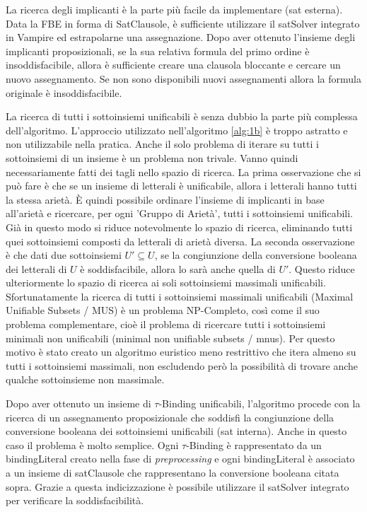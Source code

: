 \documentclass[./main.tex]{subfiles}
\begin{document}
La ricerca degli implicanti è la parte più facile da implementare (sat esterna). 
Data la FBE in forma di SatClausole, è sufficiente utilizzare il satSolver integrato in Vampire ed estrapolarne una assegnazione.
Dopo aver ottenuto l'insieme degli implicanti proposizionali, se la sua relativa 
formula del primo ordine è insoddisfacibile, allora è sufficiente creare una clausola bloccante e cercare un nuovo assegnamento.
Se non sono disponibili nuovi assegnamenti allora la formula originale è insoddisfacibile.

La ricerca di tutti i sottoinsiemi unificabili è senza dubbio la parte più complessa dell'algoritmo.
L'approccio utilizzato nell'algoritmo \ref{alg:1b} è troppo astratto e non utilizzabile nella pratica.
Anche il solo problema di iterare su tutti i sottoinsiemi di un insieme è un problema non trivale.
Vanno quindi necessariamente fatti dei tagli nello spazio di ricerca.
La prima osservazione che si può fare è che se un insieme di letterali è unificabile, allora i letterali hanno tutti la stessa arietà.
È quindi possibile ordinare l'insieme di implicanti in base all'arietà e ricercare, per ogni 'Gruppo di Arietà', tutti i sottoinsiemi unificabili.
Già in questo modo si riduce notevolmente lo spazio di ricerca, eliminando tutti quei sottoinsiemi composti da letterali di arietà diversa.
La seconda osservazione è che dati due sottoinsiemi $U' \subseteq U$, se la congiunzione della conversione booleana dei letterali di $U$ è 
soddisfacibile, allora lo sarà anche quella di $U'$. 
Questo riduce ulteriormente lo spazio di ricerca ai soli sottoinsiemi massimali unificabili.
Sfortunatamente la ricerca di tutti i sottoinsiemi massimali unificabili (Maximal Unifiable Subsets / MUS) è un problema NP-Completo, così come 
il suo problema complementare, cioè il problema di ricercare tutti i sottoinsiemi minimali non unificabili (minimal non unifiable subsets / mnus).
Per questo motivo è stato creato un algoritmo euristico meno restrittivo che itera almeno su tutti i sottoinsiemi massimali,
non escludendo però la possibilità di trovare anche qualche sottoinsieme non massimale.

Dopo aver ottenuto un insieme di $\tau$-Binding unificabili, l'algoritmo procede con la ricerca di un 
assegnamento proposizionale che soddisfi la congiunzione della conversione booleana dei sottoinsiemi unificabili (sat interna).
Anche in questo caso il problema è molto semplice. Ogni $\tau$-Binding è rappresentato da un bindingLiteral creato nella fase di \textit{preprocessing} e
ogni bindingLiteral è associato a un insieme di satClausole che rappresentano la conversione booleana citata sopra. 
Grazie a questa indicizzazione è possibile utilizzare il satSolver integrato per verificare la soddisfacibilità.
\end{document}
